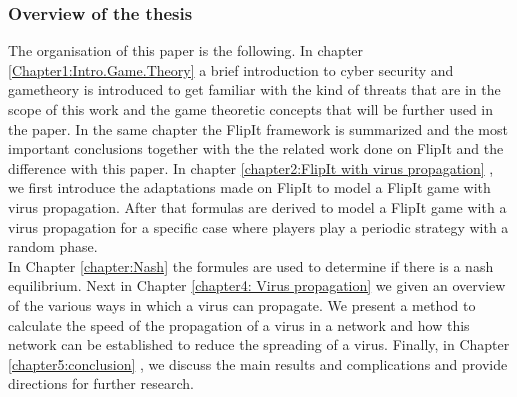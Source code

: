 \subsubsection{Overview of the thesis}

The organisation of this paper is the following.  In chapter \ref{Chapter1:Intro.Game.Theory}  a brief introduction to cyber security and gametheory is introduced to get familiar with the kind of threats that are in the scope of this work and the game theoretic concepts that will be further used in the paper. In the same chapter the FlipIt framework is summarized and the most important conclusions together with the the related work done on FlipIt and the difference with this paper.
In chapter \ref{chapter2:FlipIt with virus propagation} , we first introduce the adaptations made on FlipIt to model a FlipIt game with virus propagation. After that formulas are derived to model a FlipIt game with a virus propagation for a specific case where players play a periodic strategy with a random phase. \\
In Chapter \ref{chapter:Nash} the formules are used to determine if there is a nash equilibrium. 
Next in Chapter \ref{chapter4: Virus propagation} we given an overview of the various ways in which a virus can propagate. We present a method to calculate the speed of the propagation of a virus in a network and how this network can be established to reduce the spreading of a virus.
Finally, in Chapter \ref{chapter5:conclusion} , we discuss the main results and complications and provide directions for further research.

%
% 
%
%
%
% 
%
%
% 



